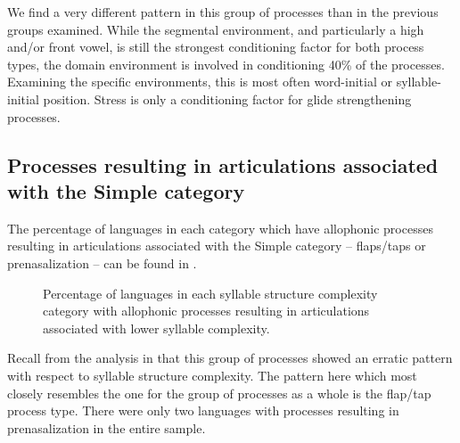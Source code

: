   We find a very different pattern in this group of processes than in the previous groups examined. While the segmental environment, and particularly a high and/or front vowel, is still the strongest conditioning factor for both process types, the domain environment is involved in conditioning 40\% of the processes. Examining the specific environments, this is most often word-initial or syllable-initial position. Stress is only a conditioning factor for glide strengthening processes.

\subsection{Processes resulting in articulations associated with the Simple category}\label{sec:7.3.5}

  The percentage of languages in each category which have allophonic processes resulting in articulations associated with the Simple category -- flaps/taps or prenasalization -- can be found in .

\begin{figure}
\caption{\label{fig:7.9}Percentage of languages in each syllable structure complexity category with allophonic processes resulting in articulations associated with lower syllable complexity.}
\end{figure}

  Recall from the analysis in  that this group of processes showed an erratic pattern with respect to syllable structure complexity. The pattern here which most closely resembles the one for the group of processes as a whole is the flap/tap process type. There were only two languages with processes resulting in prenasalization in the entire sample.

